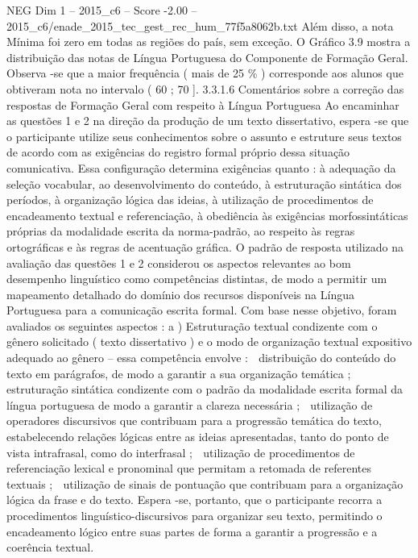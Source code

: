 \begin{textsample}{NEG Dim 1 – 2015\_c6 – Score -2.00 – 2015\_c6/enade\_2015\_tec\_gest\_rec\_hum\_77f5a8062b.txt}
Além disso, a nota Mínima foi zero em todas as regiões do país, sem exceção.
O Gráfico 3.9 mostra a distribuição das notas de Língua Portuguesa do Componente de Formação Geral.
Observa -se que a maior frequência ( mais de 25 \% ) corresponde aos alunos que obtiveram nota no intervalo ( 60 ; 70 ]. 3.3.1.6 Comentários sobre a correção das respostas de Formação Geral com respeito à Língua Portuguesa Ao encaminhar as questões 1 e 2 na direção da produção de um texto dissertativo, espera -se que o participante utilize seus conhecimentos sobre o assunto e estruture seus textos de acordo com as exigências do registro formal próprio dessa situação comunicativa.
Essa configuração determina exigências quanto : à adequação da seleção vocabular, ao desenvolvimento do conteúdo, à estruturação sintática dos períodos, à organização lógica das ideias, à utilização de procedimentos de encadeamento textual e referenciação, à obediência às exigências morfossintáticas próprias da modalidade escrita da norma-padrão, ao respeito às regras ortográficas e às regras de acentuação gráfica.
O padrão de resposta utilizado na avaliação das questões 1 e 2 considerou os aspectos relevantes ao bom desempenho linguístico como competências distintas, de modo a permitir um mapeamento detalhado do domínio dos recursos disponíveis na Língua Portuguesa para a comunicação escrita formal.
Com base nesse objetivo, foram avaliados os seguintes aspectos : a ) Estruturação textual condizente com o gênero solicitado ( texto dissertativo ) e o modo de organização textual expositivo adequado ao gênero – essa competência envolve :  distribuição do conteúdo do texto em parágrafos, de modo a garantir a sua organização temática ;  estruturação sintática condizente com o padrão da modalidade escrita formal da língua portuguesa de modo a garantir a clareza necessária ;  utilização de operadores discursivos que contribuam para a progressão temática do texto, estabelecendo relações lógicas entre as ideias apresentadas, tanto do ponto de vista intrafrasal, como do interfrasal ;  utilização de procedimentos de referenciação lexical e pronominal que permitam a retomada de referentes textuais ;  utilização de sinais de pontuação que contribuam para a organização lógica da frase e do texto.
Espera -se, portanto, que o participante recorra a procedimentos linguístico-discursivos para organizar seu texto, permitindo o encadeamento lógico entre suas partes de forma a garantir a progressão e a coerência textual.

\end{textsample}
